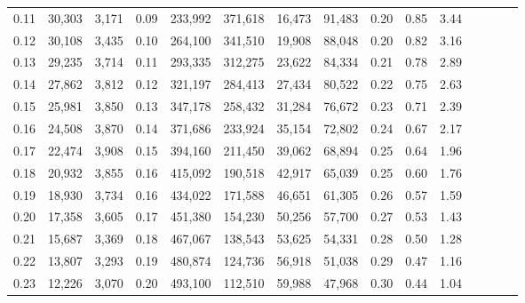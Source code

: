 \begin{tabular}{rrrcrrrrrrrrrrr}
0.11 &  30,303 &  3,171 &                                       0.09 &  233,992 &  371,618 &   16,473 &   91,483 &  0.20 &  0.85 &                         3.44 \\
0.12 &  30,108 &  3,435 &                                       0.10 &  264,100 &  341,510 &   19,908 &   88,048 &  0.20 &  0.82 &                         3.16 \\
0.13 &  29,235 &  3,714 &                                       0.11 &  293,335 &  312,275 &   23,622 &   84,334 &  0.21 &  0.78 &                         2.89 \\
0.14 &  27,862 &  3,812 &                                       0.12 &  321,197 &  284,413 &   27,434 &   80,522 &  0.22 &  0.75 &                         2.63 \\
0.15 &  25,981 &  3,850 &                                       0.13 &  347,178 &  258,432 &   31,284 &   76,672 &  0.23 &  0.71 &                         2.39 \\
0.16 &  24,508 &  3,870 &                                       0.14 &  371,686 &  233,924 &   35,154 &   72,802 &  0.24 &  0.67 &                         2.17 \\
0.17 &  22,474 &  3,908 &                                       0.15 &  394,160 &  211,450 &   39,062 &   68,894 &  0.25 &  0.64 &                         1.96 \\
0.18 &  20,932 &  3,855 &                                       0.16 &  415,092 &  190,518 &   42,917 &   65,039 &  0.25 &  0.60 &                         1.76 \\
0.19 &  18,930 &  3,734 &                                       0.16 &  434,022 &  171,588 &   46,651 &   61,305 &  0.26 &  0.57 &                         1.59 \\
0.20 &  17,358 &  3,605 &                                       0.17 &  451,380 &  154,230 &   50,256 &   57,700 &  0.27 &  0.53 &                         1.43 \\
0.21 &  15,687 &  3,369 &                                       0.18 &  467,067 &  138,543 &   53,625 &   54,331 &  0.28 &  0.50 &                         1.28 \\
0.22 &  13,807 &  3,293 &                                       0.19 &  480,874 &  124,736 &   56,918 &   51,038 &  0.29 &  0.47 &                         1.16 \\
0.23 &  12,226 &  3,070 &                                       0.20 &  493,100 &  112,510 &   59,988 &   47,968 &  0.30 &  0.44 &                         1.04 \\

\end{tabular}
